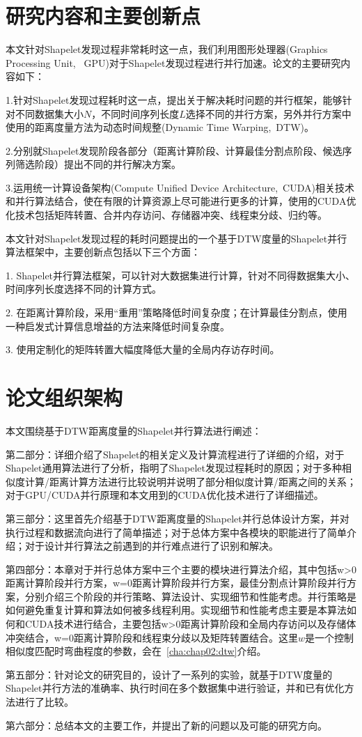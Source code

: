 \section{研究内容和主要创新点}

本文针对Shapelet发现过程非常耗时这一点，我们利用图形处理器(Graphics Processing Unit, ~GPU)对于Shapelet发现过程进行并行加速。论文的主要研究内容如下：

1.针对Shapelet发现过程耗时这一点，提出关于解决耗时问题的并行框架，能够针对不同数据集大小$N$，不同时间序列长度$L$选择不同的并行方案，另外并行方案中使用的距离度量方法为动态时间规整(Dynamic Time Warping,~DTW)。

2.分别就Shapelet发现阶段各部分（距离计算阶段、计算最佳分割点阶段、候选序列筛选阶段）提出不同的并行解决方案。

3.运用统一计算设备架构(Compute Unified Device Architecture,~CUDA)相关技术和并行算法结合，使在有限的计算资源上尽可能进行更多的计算，使用的CUDA优化技术包括矩阵转置、合并内存访问、存储器冲突、线程束分歧、归约等。

本文针对Shapelet发现过程的耗时问题提出的一个基于DTW度量的Shapelet并行算法框架中，主要创新点包括以下三个方面：

1. Shapelet并行算法框架，可以针对大数据集进行计算，针对不同得数据集大小、时间序列长度选择不同的计算方式。

2. 在距离计算阶段，采用“重用”策略降低时间复杂度；在计算最佳分割点，使用一种启发式计算信息增益的方法来降低时间复杂度。

3. 使用定制化的矩阵转置大幅度降低大量的全局内存访存时间。

\section{论文组织架构}

本文围绕基于DTW距离度量的Shapelet并行算法进行阐述：

第二部分：详细介绍了Shapelet的相关定义及计算流程进行了详细的介绍，对于Shapelet通用算法进行了分析，指明了Shapelet发现过程耗时的原因；对于多种相似度计算/距离计算方法进行比较说明并说明了部分相似度计算/距离之间的关系；对于GPU/CUDA并行原理和本文用到的CUDA优化技术进行了详细描述。

第三部分：这里首先介绍基于DTW距离度量的Shapelet并行总体设计方案，并对执行过程和数据流向进行了简单描述；对于总体方案中各模块的职能进行了简单介绍；对于设计并行算法之前遇到的并行难点进行了识别和解决。

第四部分：本章对于并行总体方案中三个主要的模块进行算法介绍，其中包括w>0距离计算阶段并行方案，w=0距离计算阶段并行方案，最佳分割点计算阶段并行方案，分别介绍三个阶段的并行策略、算法设计、实现细节和性能考虑。并行策略是如何避免重复计算和算法如何被多线程利用。实现细节和性能考虑主要是本算法如何和CUDA技术进行结合，主要包括w>0距离计算阶段和全局内存访问以及存储体冲突结合，w=0距离计算阶段和线程束分歧以及矩阵转置结合。这里$w$是一个控制相似度匹配时弯曲程度的参数，会在~\ref{cha:chap02:dtw}介绍。

第五部分：针对论文的研究目的，设计了一系列的实验，就基于DTW度量的Shapelet并行方法的准确率、执行时间在多个数据集中进行验证，并和已有优化方法进行了比较。

第六部分：总结本文的主要工作，并提出了新的问题以及可能的研究方向。
